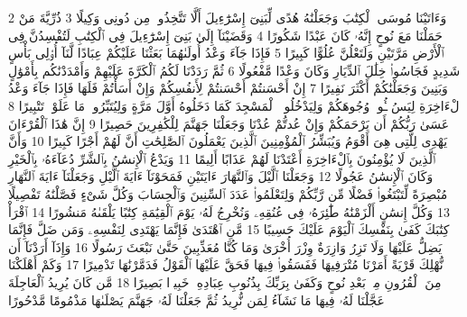 {\tiny\colorbox{cl_aya}{2}} وَءَاتَيْنَا مُوسَى ٱلْكِتَٰبَ وَجَعَلْنَٰهُ هُدًى لِّبَنِىٓ إِسْرَٰٓءِيلَ أَلَّا تَتَّخِذُوا۟ مِن دُونِى وَكِيلًا
{\tiny\colorbox{cl_aya}{3}} ذُرِّيَّةَ مَنْ حَمَلْنَا مَعَ نُوحٍ إِنَّهُۥ كَانَ عَبْدًا شَكُورًا
{\tiny\colorbox{cl_aya}{4}} وَقَضَيْنَآ إِلَىٰ بَنِىٓ إِسْرَٰٓءِيلَ فِى ٱلْكِتَٰبِ لَتُفْسِدُنَّ فِى ٱلْأَرْضِ مَرَّتَيْنِ وَلَتَعْلُنَّ عُلُوًّا كَبِيرًا
{\tiny\colorbox{cl_aya}{5}} فَإِذَا جَآءَ وَعْدُ أُولَىٰهُمَا بَعَثْنَا عَلَيْكُمْ عِبَادًا لَّنَآ أُو۟لِى بَأْسٍ شَدِيدٍ فَجَاسُوا۟ خِلَٰلَ ٱلدِّيَارِ وَكَانَ وَعْدًا مَّفْعُولًا
{\tiny\colorbox{cl_aya}{6}} ثُمَّ رَدَدْنَا لَكُمُ ٱلْكَرَّةَ عَلَيْهِمْ وَأَمْدَدْنَٰكُم بِأَمْوَٰلٍ وَبَنِينَ وَجَعَلْنَٰكُمْ أَكْثَرَ نَفِيرًا
{\tiny\colorbox{cl_aya}{7}} إِنْ أَحْسَنتُمْ أَحْسَنتُمْ لِأَنفُسِكُمْ وَإِنْ أَسَأْتُمْ فَلَهَا فَإِذَا جَآءَ وَعْدُ ٱلْءَاخِرَةِ لِيَسُۥٓـُٔوا۟ وُجُوهَكُمْ وَلِيَدْخُلُوا۟ ٱلْمَسْجِدَ كَمَا دَخَلُوهُ أَوَّلَ مَرَّةٍ وَلِيُتَبِّرُوا۟ مَا عَلَوْا۟ تَتْبِيرًا
{\tiny\colorbox{cl_aya}{8}} عَسَىٰ رَبُّكُمْ أَن يَرْحَمَكُمْ وَإِنْ عُدتُّمْ عُدْنَا وَجَعَلْنَا جَهَنَّمَ لِلْكَٰفِرِينَ حَصِيرًا
{\tiny\colorbox{cl_aya}{9}} إِنَّ هَٰذَا ٱلْقُرْءَانَ يَهْدِى لِلَّتِى هِىَ أَقْوَمُ وَيُبَشِّرُ ٱلْمُؤْمِنِينَ ٱلَّذِينَ يَعْمَلُونَ ٱلصَّٰلِحَٰتِ أَنَّ لَهُمْ أَجْرًا كَبِيرًا
{\tiny\colorbox{cl_aya}{10}} وَأَنَّ ٱلَّذِينَ لَا يُؤْمِنُونَ بِٱلْءَاخِرَةِ أَعْتَدْنَا لَهُمْ عَذَابًا أَلِيمًا
{\tiny\colorbox{cl_aya}{11}} وَيَدْعُ ٱلْإِنسَٰنُ بِٱلشَّرِّ دُعَآءَهُۥ بِٱلْخَيْرِ وَكَانَ ٱلْإِنسَٰنُ عَجُولًا
{\tiny\colorbox{cl_aya}{12}} وَجَعَلْنَا ٱلَّيْلَ وَٱلنَّهَارَ ءَايَتَيْنِ فَمَحَوْنَآ ءَايَةَ ٱلَّيْلِ وَجَعَلْنَآ ءَايَةَ ٱلنَّهَارِ مُبْصِرَةً لِّتَبْتَغُوا۟ فَضْلًا مِّن رَّبِّكُمْ وَلِتَعْلَمُوا۟ عَدَدَ ٱلسِّنِينَ وَٱلْحِسَابَ وَكُلَّ شَىْءٍ فَصَّلْنَٰهُ تَفْصِيلًا
{\tiny\colorbox{cl_aya}{13}} وَكُلَّ إِنسَٰنٍ أَلْزَمْنَٰهُ طَٰٓئِرَهُۥ فِى عُنُقِهِۦ وَنُخْرِجُ لَهُۥ يَوْمَ ٱلْقِيَٰمَةِ كِتَٰبًا يَلْقَىٰهُ مَنشُورًا
{\tiny\colorbox{cl_aya}{14}} ٱقْرَأْ كِتَٰبَكَ كَفَىٰ بِنَفْسِكَ ٱلْيَوْمَ عَلَيْكَ حَسِيبًا
{\tiny\colorbox{cl_aya}{15}} مَّنِ ٱهْتَدَىٰ فَإِنَّمَا يَهْتَدِى لِنَفْسِهِۦ وَمَن ضَلَّ فَإِنَّمَا يَضِلُّ عَلَيْهَا وَلَا تَزِرُ وَازِرَةٌ وِزْرَ أُخْرَىٰ وَمَا كُنَّا مُعَذِّبِينَ حَتَّىٰ نَبْعَثَ رَسُولًا
{\tiny\colorbox{cl_aya}{16}} وَإِذَآ أَرَدْنَآ أَن نُّهْلِكَ قَرْيَةً أَمَرْنَا مُتْرَفِيهَا فَفَسَقُوا۟ فِيهَا فَحَقَّ عَلَيْهَا ٱلْقَوْلُ فَدَمَّرْنَٰهَا تَدْمِيرًا
{\tiny\colorbox{cl_aya}{17}} وَكَمْ أَهْلَكْنَا مِنَ ٱلْقُرُونِ مِنۢ بَعْدِ نُوحٍ وَكَفَىٰ بِرَبِّكَ بِذُنُوبِ عِبَادِهِۦ خَبِيرًۢا بَصِيرًا
{\tiny\colorbox{cl_aya}{18}} مَّن كَانَ يُرِيدُ ٱلْعَاجِلَةَ عَجَّلْنَا لَهُۥ فِيهَا مَا نَشَآءُ لِمَن نُّرِيدُ ثُمَّ جَعَلْنَا لَهُۥ جَهَنَّمَ يَصْلَىٰهَا مَذْمُومًا مَّدْحُورًا
